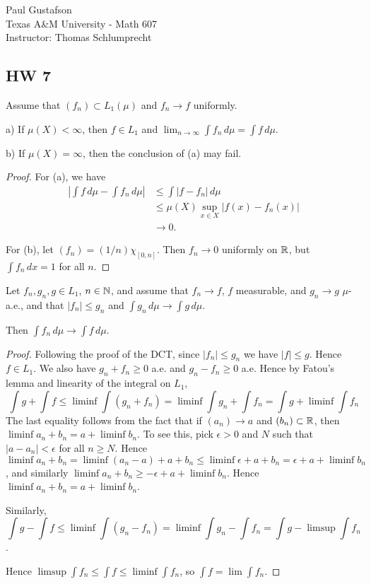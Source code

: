 \documentclass{article}
\begin{document}
\noindent Paul Gustafson\\
\noindent Texas A\&M University - Math 607\\ 
\noindent Instructor: Thomas Schlumprecht

\subsection*{HW 7}
 Assume that $(f_n) \subset L_1(\mu)$ and $f_n \to f$ uniformly.

a) If $\mu(X) < \infty$, then $f \in L_1$ and $\lim_{n\to \infty} \int f_n \, d \mu = \int f \, d\mu$.

b) If $\mu(X) = \infty$, then the conclusion of (a) may fail.

\begin{proof}
For (a), we have
\begin{align*}
\left | \int f \, d \mu - \int f_n \, d \mu \right| & \le \int |f - f_n| \, d \mu
\\ & \le \mu(X) \sup_{x \in X} |f(x) - f_n(x)|
\\ & \to 0.
\end{align*}

For (b), let $(f_n) = (1/n) \chi_{[0,n]}$. Then $f_n \to 0$ uniformly on $\mathbb{R}$, but $\int f_n \, dx = 1$ for all $n$.
\end{proof}

 Let $f_n, g_n, g \in L_1$, $n \in \mathbb{N}$, and assume that $f_n \to f$, $f$ measurable, and $g_n \to g$ $\mu$-a.e., and that $|f_n| \le g_n$ and $\int g_n \, d \mu \to \int g \, d\mu$. 

Then $\int f_n \, d \mu \to \int f \, d \mu$.

\begin{proof}
Following the proof of the DCT, since $|f_n| \le g_n$ we have $|f| \le g$. Hence $f \in L_1$. We also have $g_n + f_n \ge 0$ a.e. and $g_n - f_n \ge 0$ a.e.  Hence by Fatou's lemma and linearity of the integral on $L_1$,
$$\int g + \int f \le \liminf \int (g_n + f_n)= \liminf \int g_n +  \int f_n = \int g + \liminf \int f_n$$
The last equality follows from the fact that if $(a_n) \to a$ and $(b_n) \subset \mathbb{R}$, then $\liminf a_n + b_n = a + \liminf b_n$.  To see this, pick $\epsilon > 0$ and $N$ such that $|a - a_n| < \epsilon$ for all $n \ge N$.  Hence $\liminf a_n + b_n = \liminf (a_n - a) + a + b_n \le \liminf \epsilon + a +  b_n = \epsilon + a + \liminf b_n$, and similarly $\liminf a_n + b_n \ge -\epsilon + a + \liminf b_n$.   Hence $\liminf a_n + b_n = a + \liminf b_n$.

Similarly,
$$\int g - \int f \le \liminf \int (g_n - f_n) = \liminf \int g_n -  \int f_n = \int g - \limsup \int f_n$$.

Hence $\limsup \int f_n \le \int f \le \liminf \int f_n$, so $\int f = \lim \int f_n$.
\end{proof}
\end{document}
